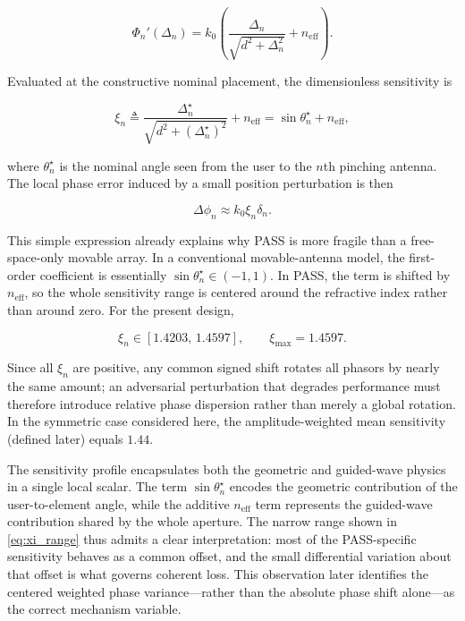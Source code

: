 \begin{equation}
\Phi_n'(\Delta_n)
= k_0\left(\frac{\Delta_n}{\sqrt{d^2+\Delta_n^2}} + n_{\mathrm{eff}}\right).
\label{eq:phase_derivative}
\end{equation}

Evaluated at the constructive nominal placement, the dimensionless sensitivity is

\begin{equation}
\xi_n
\triangleq \frac{\Delta_n^\star}{\sqrt{d^2+(\Delta_n^\star)^2}} + n_{\mathrm{eff}}
= \sin \theta_n^\star + n_{\mathrm{eff}},
\label{eq:xi_def}
\end{equation}

where $\theta_n^\star$ is the nominal angle seen from the user to the $n$th pinching antenna. The local phase error induced by a small position perturbation is then

\begin{equation}
\Delta \phi_n \approx k_0 \xi_n \delta_n.
\label{eq:local_phase_error}
\end{equation}

This simple expression already explains why PASS is more fragile than a free-space-only movable array. In a conventional movable-antenna model, the first-order coefficient is essentially $\sin \theta_n^\star \in (-1,1)$. In PASS, the term is shifted by $n_{\mathrm{eff}}$, so the whole sensitivity range is centered around the refractive index rather than around zero. For the present design,

\begin{equation}
\xi_n \in [1.4203,\, 1.4597],
\qquad
\xi_{\max} = 1.4597.
\label{eq:xi_range}
\end{equation}

Since all $\xi_n$ are positive, any common signed shift rotates all phasors by nearly the same amount; an adversarial perturbation that degrades performance must therefore introduce relative phase dispersion rather than merely a global rotation. In the symmetric case considered here, the amplitude-weighted mean sensitivity (defined later) equals $1.44$.

The sensitivity profile encapsulates both the geometric and guided-wave physics in a single local scalar. The term $\sin \theta_n^\star$ encodes the geometric contribution of the user-to-element angle, while the additive $n_{\mathrm{eff}}$ term represents the guided-wave contribution shared by the whole aperture. The narrow range shown in \eqref{eq:xi_range} thus admits a clear interpretation: most of the PASS-specific sensitivity behaves as a common offset, and the small differential variation about that offset is what governs coherent loss. This observation later identifies the centered weighted phase variance—rather than the absolute phase shift alone—as the correct mechanism variable.

